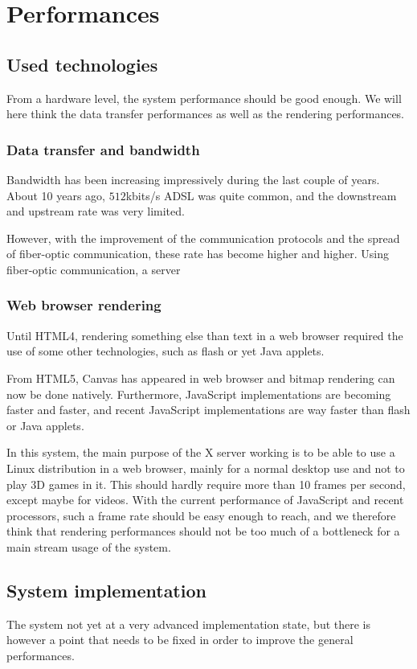 \section{Performances}
\label{sec:performances}
%
\subsection{Used technologies}
From a hardware level, the system performance should be good enough. We will 
here think the data transfer performances as well as the rendering performances.
%
\subsubsection{Data transfer and bandwidth}
%
Bandwidth has been increasing impressively during the last couple of years. 
About 10 years ago, $512$kbits/s ADSL was quite common, and the downstream and 
upstream rate was very limited. 

However, with the improvement of the communication protocols and the 
spread of fiber-optic communication, these rate has become higher and higher.
Using fiber-optic communication, a server 
%
\subsubsection{Web browser rendering}
%
Until HTML4, rendering something else than text in a web browser required the 
use of some other technologies, such as flash or yet Java applets. 

From HTML5, Canvas has appeared in web browser and bitmap rendering can now 
be done natively. Furthermore, JavaScript implementations
are becoming faster and faster, and recent JavaScript implementations 
are way faster than flash or Java applets\cite{js-vs-as}.

In this system, the main purpose of the X server working is to be able to use
a Linux distribution in a web browser, mainly for a normal desktop use and 
not to play 3D games in it. This should hardly require more than 10 frames per second, 
except maybe for videos. With the current performance of JavaScript and 
recent processors, such a frame rate should be easy enough to reach, and we 
therefore think that rendering performances should not be too much of a bottleneck 
for a main stream usage of the system.
%
\subsection{System implementation}
%
The system not yet at a very advanced implementation state, but there is however a point that 
needs to be fixed in order to improve the general performances.


